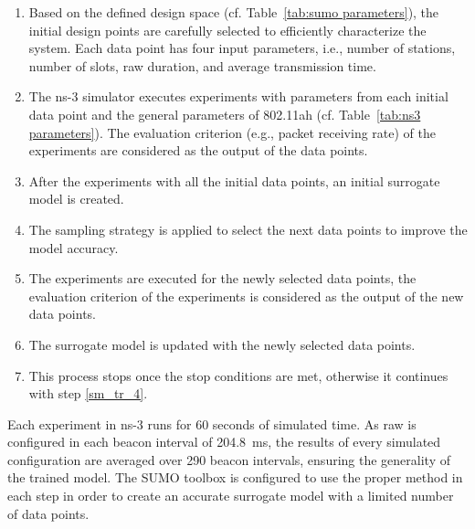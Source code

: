 \begin{enumerate}

\item \label{sm_tr_1} Based on the defined design space (cf. Table~\ref{tab:sumo parameters}), the initial design points are carefully selected to efficiently characterize the system. Each data point has four input parameters, i.e., number of stations, number of slots, \gls{raw} duration, and average transmission time.


\item \label{sm_tr_2} The ns-3 simulator executes experiments with parameters from each initial data point and the general parameters of 802.11ah (cf. Table~\ref{tab:ns3 parameters}). The evaluation criterion (e.g., packet receiving rate) of the experiments are considered as the output of the data points. 

\item \label{sm_tr_3} After the experiments with all the initial data points, an initial surrogate model is created.


\item \label{sm_tr_4} The sampling strategy is applied to select the next data points to improve the model accuracy.

\item \label{sm_tr_5} The experiments are executed for the newly selected data points, the evaluation criterion of the experiments is considered as the output of the new data points. 

\item \label{sm_tr_6} The surrogate model is updated with the newly selected data points.

\item \label{sm_tr_7}  This process stops once the stop conditions are met, otherwise it continues with step \ref{sm_tr_4}.
\end{enumerate}


Each experiment in ns-3 runs for 60 seconds of simulated time. As \gls{raw} is configured in each beacon interval of 204.8~ms, the results of every simulated configuration are averaged over 290 beacon intervals, ensuring the generality of the trained model.
The SUMO toolbox is configured to use the proper method in each step in order to create an accurate surrogate model with a limited number of data points. 


